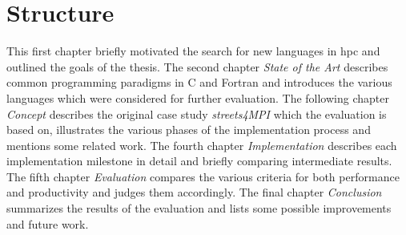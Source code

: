 \section{Structure}
\label{sec:Introduction::Structure}

This first chapter briefly motivated the search for new languages in \gls{hpc} and outlined the goals of the thesis. The second chapter \textit{State of the Art} describes common programming paradigms in C and Fortran and introduces the various languages which were considered for further evaluation. The following chapter \textit{Concept} describes the original case study \textit{streets4MPI} which the evaluation is based on, illustrates the various phases of the implementation process and mentions some related work. The fourth chapter \textit{Implementation} describes each implementation milestone in detail and briefly comparing intermediate results. The fifth chapter \textit{Evaluation} compares the various criteria for both performance and productivity and judges them accordingly. The final chapter \textit{Conclusion} summarizes the results of the evaluation and lists some possible improvements and future work.
